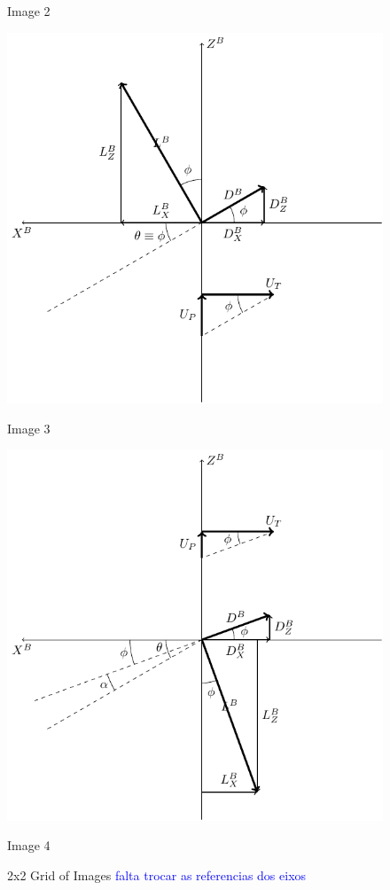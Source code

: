 \begin{figure}[!htb]
\begin{minipage}{0.45\textwidth}
        \caption{Image 2}
    \end{minipage}
    \vfill
    \begin{minipage}{0.45\textwidth}
        \centering
        \includegraphics[width=\linewidth]{Figures/implementation/bet/blade_forces/blade_element_forces_3.pdf} %
        \caption{Image 3}
    \end{minipage}
    \hfill
    \begin{minipage}{0.45\textwidth}
        \centering
        \includegraphics[width=\linewidth]{Figures/implementation/bet/blade_forces/blade_element_forces_4.pdf} %
        \caption{Image 4}
    \end{minipage}
    \caption{2x2 Grid of Images \textcolor{blue}{falta trocar as referencias dos eixos}}
\end{figure}


